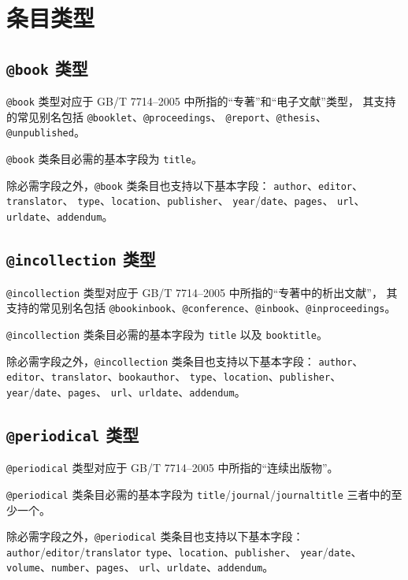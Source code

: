 \documentclass[UTF8, fancyhdr, hyperref]{ctexart}
\begin{document}
\section{条目类型}\label{sec:entries}
\subsection{\texttt{@book} 类型}

\verb|@book| 类型对应于 GB/T 7714--2005 中所指的“专著”和“电子文献”类型，
其支持的常见别名包括 \verb|@booklet|、\verb|@proceedings|、
\verb|@report|、\verb|@thesis|、\verb|@unpublished|。

\verb|@book| 类条目必需的基本字段为 \verb|title|。

除必需字段之外，\verb|@book| 类条目也支持以下基本字段：
\verb|author|、\verb|editor|、\verb|translator|、
\verb|type|、\verb|location|、\verb|publisher|、
\verb|year|/\verb|date|、\verb|pages|、
\verb|url|、\verb|urldate|、\verb|addendum|。

\subsection{\texttt{@incollection} 类型}

\verb|@incollection| 类型对应于 GB/T 7714--2005 中所指的“专著中的析出文献”，
其支持的常见别名包括
\verb|@bookinbook|、\verb|@conference|、\verb|@inbook|、\verb|@inproceedings|。

\verb|@incollection| 类条目必需的基本字段为 \verb|title| 以及 \verb|booktitle|。

除必需字段之外，\verb|@incollection| 类条目也支持以下基本字段：
\verb|author|、\verb|editor|、\verb|translator|、\verb|bookauthor|、
\verb|type|、\verb|location|、\verb|publisher|、
\verb|year|/\verb|date|、\verb|pages|、
\verb|url|、\verb|urldate|、\verb|addendum|。

\subsection{\texttt{@periodical} 类型}

\verb|@periodical| 类型对应于 GB/T 7714--2005 中所指的“连续出版物”。

\verb|@periodical| 类条目必需的基本字段为
\verb|title|/\verb|journal|/\verb|journaltitle| 三者中的至少一个。

除必需字段之外，\verb|@periodical| 类条目也支持以下基本字段：
\verb|author|/\verb|editor|/\verb|translator| 
\verb|type|、\verb|location|、\verb|publisher|、
\verb|year|/\verb|date|、\verb|volume|、\verb|number|、\verb|pages|、
\verb|url|、\verb|urldate|、\verb|addendum|。
\end{document}
